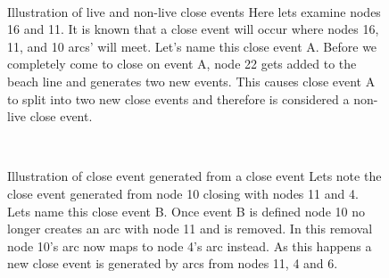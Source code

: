 \documentclass{egpubl}
\begin{document}
\begin{figure}
	\centering
	 \\
	\caption{Illustration of live and non-live close events 
		\protect{} Here lets examine nodes 16 and 11. It is known that a close event will occur where nodes 16, 11, and 10 arcs' will meet. Let's name this close event A.
		\protect{} Before we completely come to close on event A, node 22 gets added to the beach line and generates two new events. This causes  close event A to split into two new close events and therefore is considered a non-live close event. 
	}
	\label{fig:live_events}
\end{figure}

\begin{figure}
	\centering
	 \\
	\caption{Illustration of close event generated from a close event
		\protect{} Lets note the close event generated from node 10 closing with nodes 11 and 4. Lets name this close event B.
		\protect{} Once event B is defined node 10 no longer creates an arc with node 11 and is removed. In this removal node 10's arc now maps to node 4's arc instead. As this happens a new close event is generated by arcs from nodes 11, 4 and 6.
	}
	\label{fig:close_events}
\end{figure}

\end{document}
